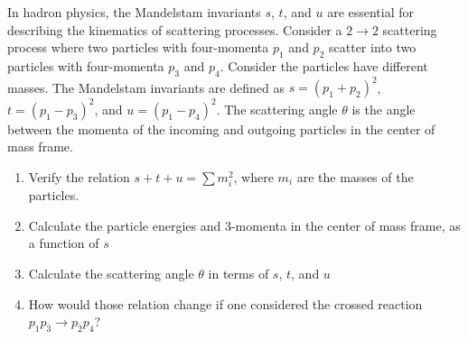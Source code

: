 
\newcommand{\ma}{\ensuremath{M}\xspace}
\newcommand{\mb}{\ensuremath{m_1}\xspace}
\newcommand{\mc}{\ensuremath{m_2}\xspace}
\newcommand{\eb}{\ensuremath{E_1}\xspace}
\newcommand{\ec}{\ensuremath{E_2}\xspace}

\newcommand{\pb}{\ensuremath{p_1}\xspace}
\newcommand{\pc}{\ensuremath{p_2}\xspace}
\newcommand{\pvecb}{\ensuremath{\textbf{p}_1}\xspace}
\newcommand{\pvecc}{\ensuremath{\textbf{p}_2}\xspace}
\newcommand{\pvecstar}{\ensuremath{\textbf{p}^{*}}\xspace}
\newcommand{\pmodvecb}{\ensuremath{\text{p}_1}\xspace}
\newcommand{\pmodvecc}{\ensuremath{\text{p}_2}\xspace}
\newcommand{\pmodvecstar}{\ensuremath{\text{p}^{*}}\xspace}


In hadron physics, the Mandelstam invariants \(s\), \(t\), and \(u\) are essential for describing the kinematics of scattering processes. Consider a \(2 \rightarrow 2\) scattering process where two particles with four-momenta \(p_1\) and \(p_2\) scatter into two particles with four-momenta \(p_3\) and \(p_4\). Consider the particles have different masses. The Mandelstam invariants are defined as \(s = (p_1 + p_2)^2\), \(t = (p_1 - p_3)^2\), and \(u = (p_1 - p_4)^2\). 
The scattering angle \(\theta\) is the angle between the momenta of the incoming and outgoing particles in the center of mass frame. 



\begin{enumerate}
\item Verify the relation \(s + t + u = \sum m_i^2\), where \(m_i\) are the masses of the particles.
\item Calculate the particle energies and 3-momenta in the center of mass frame, as a function of $s$
    \item Calculate the scattering angle  \(\theta\) in terms of \(s\), \(t\), and \(u\)
    \item How would those relation change if one considered the crossed reaction $p_1 p_{\bar 3} \to p_{\bar 2} p_4$?
\end{enumerate}
